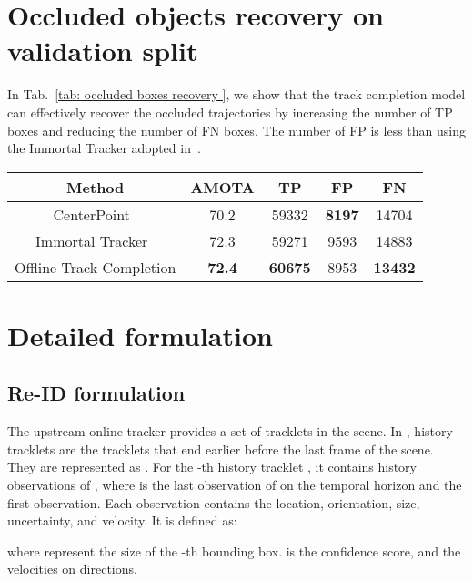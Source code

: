\documentclass{article} \usepackage{iclr2023_conference,times}
\begin{document}
\section{Occluded objects recovery on validation split}
\label{sec: occluded boxes recovery}
In Tab.~\ref{tab: occluded boxes recovery }, we show that the track completion model can effectively recover the occluded trajectories by increasing the number of TP boxes and reducing the number of FN boxes. The number of FP is less than using the Immortal Tracker adopted in~\cite{Detzero, CTRL}.
\vspace{-3mm}
\begin{table*}[h]
\centering
\begin{tabular}{c|cccc}
\textbf{Method}                   & \textbf{AMOTA}         & \textbf{TP}             & \textbf{FP}            & \textbf{FN}             \\ \hline
CenterPoint~\cite{Centerpoint}              & 70.2          & 59332          & \textbf{8197} & 14704          \\
Immortal Tracker~\cite{Immortaltrackers}                & 72.3          & 59271          & 9593          & 14883          \\ \hline 
Offline Track Completion & \textbf{72.4} & \textbf{60675} & 8953          & \textbf{13432}
\end{tabular}
\caption{Our track completion model can effectively recover the occluded objects by increasing TP (All-boxes setup). }
\label{tab: occluded boxes recovery }
\end{table*}

\section{Detailed formulation}
\label{sec: Formulation}
\subsection{Re-ID formulation}
\label{sec: Re-ID formulation}
The upstream online tracker provides a set of tracklets  in the scene. In , history tracklets are the tracklets that end earlier before the last frame of the scene. They are represented as . For the -th history tracklet , it contains history observations of , where  is the last observation of  on the temporal horizon and  the first observation. Each observation contains the location, orientation, size, uncertainty, and velocity. It is defined as:

where  represent the size of the -th bounding box.  is the confidence score, and  the velocities on  directions.
\end{document}
